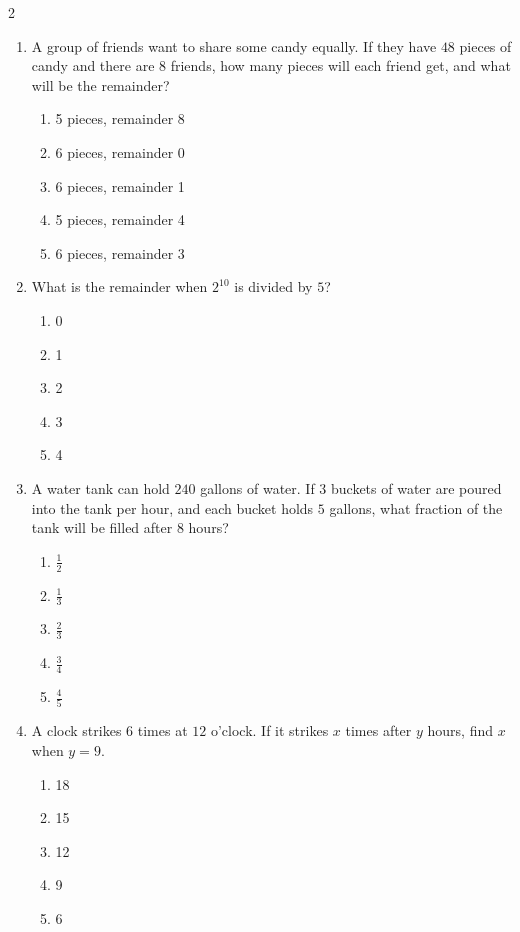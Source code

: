 \documentclass[10pt]{article}
\begin{document}
\begin{multicols}{2}
\begin{enumerate}[label=\textbf{Q\arabic*.}, leftmargin=*, itemsep=6pt, parsep=0pt]
  \item \small A group of friends want to share some candy equally. If they have $48$ pieces of candy and there are $8$ friends, how many pieces will each friend get, and what will be the remainder?
  \begin{enumerate}[label=(\Alph*), leftmargin=0.6cm, nosep, itemsep=2pt]
    \item 5 pieces, remainder 8
    \item 6 pieces, remainder 0
    \item 6 pieces, remainder 1
    \item 5 pieces, remainder 4
    \item 6 pieces, remainder 3
  \end{enumerate}

  \item \small What is the remainder when $2^{10}$ is divided by $5$?
  \begin{enumerate}[label=(\Alph*), leftmargin=0.6cm, nosep, itemsep=2pt]
    \item 0
    \item 1
    \item 2
    \item 3
    \item 4
  \end{enumerate}

  \item \small A water tank can hold $240$ gallons of water. If $3$ buckets of water are poured into the tank per hour, and each bucket holds $5$ gallons, what fraction of the tank will be filled after $8$ hours?
  \begin{enumerate}[label=(\Alph*), leftmargin=0.6cm, nosep, itemsep=2pt]
    \item $\frac{1}{2}$
    \item $\frac{1}{3}$
    \item $\frac{2}{3}$
    \item $\frac{3}{4}$
    \item $\frac{4}{5}$
  \end{enumerate}

  \item \small A clock strikes $6$ times at $12$ o'clock. If it strikes $x$ times after $y$ hours, find $x$ when $y = 9$.
  \begin{enumerate}[label=(\Alph*), leftmargin=0.6cm, nosep, itemsep=2pt]
    \item 18
    \item 15
    \item 12
    \item 9
    \item 6
  \end{enumerate}


\end{enumerate}
\end{multicols}
\end{document}
